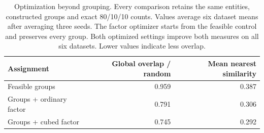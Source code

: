 \begin{table}[htbp]\centering
\begin{tabular}{lrr}\toprule
Assignment & Global overlap / random & Mean nearest similarity\\\midrule
Feasible groups & 0.959 & 0.387\\
Groups + ordinary factor & 0.791 & 0.306\\
Groups + cubed factor & 0.745 & 0.292\\
\bottomrule\end{tabular}
\caption{Optimization beyond grouping. Every comparison retains the same entities, constructed groups and exact 80/10/10 counts. Values average six dataset means after averaging three seeds. The factor optimizer starts from the feasible control and preserves every group. Both optimized settings improve both measures on all six datasets. Lower values indicate less overlap.}
\label{tab:matched-groups}\end{table}

